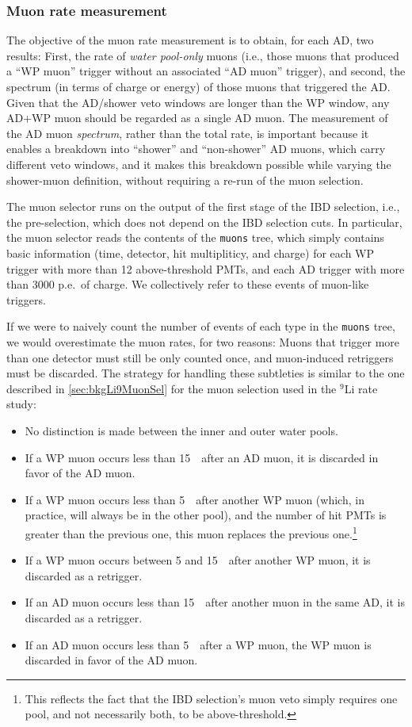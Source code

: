 \documentclass[../thesis.tex]{subfiles}
\begin{document}
\subsubsection{Muon rate measurement}%
\label{sec:cutVaryMuRate}

The objective of the muon rate measurement is to obtain, for each AD, two results: First, the rate of \emph{water pool-only} muons (i.e., those muons that produced a ``WP muon'' trigger without an associated ``AD muon'' trigger), and second, the spectrum (in terms of charge or energy) of those muons that triggered the AD\@. Given that the AD/shower veto windows are longer than the WP window, any AD+WP muon should be regarded as a single AD muon. The measurement of the AD muon \emph{spectrum}, rather than the total rate, is important because it enables a breakdown into ``shower'' and ``non-shower'' AD muons, which carry different veto windows, and it makes this breakdown possible while varying the shower-muon definition, without requiring a re-run of the muon selection.

The muon selector runs on the output of the first stage of the IBD selection, i.e., the pre-selection, which does not depend on the IBD selection cuts. In particular, the muon selector reads the contents of the \texttt{muons} tree, which simply contains basic information (time, detector, hit multipliticy, and charge) for each WP trigger with more than 12 above-threshold PMTs, and each AD trigger with more than 3000 p.e.\ of charge. We collectively refer to these events of muon-like triggers.

If we were to naively count the number of events of each type in the \texttt{muons} tree, we would overestimate the muon rates, for two reasons: Muons that trigger more than one detector must still be only counted once, and muon-induced retriggers must be discarded. The strategy for handling these subtleties is similar to the one described in \autoref{sec:bkgLi9MuonSel} for the muon selection used in the $^9$Li rate study:

\begin{itemize}
\item No distinction is made between the inner and outer water pools.
\item If a WP muon occurs less than 15~\us\ after an AD muon, it is discarded in favor of the AD muon.
\item If a WP muon occurs less than 5~\us\ after another WP muon (which, in practice, will always be in the other pool), and the number of hit PMTs is greater than the previous one, this muon replaces the previous one.\footnote{This reflects the fact that the IBD selection's muon veto simply requires one pool, and not necessarily both, to be above-threshold.}
\item If a WP muon occurs between 5 and 15~\us\ after another WP muon, it is discarded as a retrigger.
\item If an AD muon occurs less than 15~\us\ after another muon in the same AD, it is discarded as a retrigger.
\item If an AD muon occurs less than 5~\us\ after a WP muon, the WP muon is discarded in favor of the AD muon.
\end{itemize}
\end{document}
